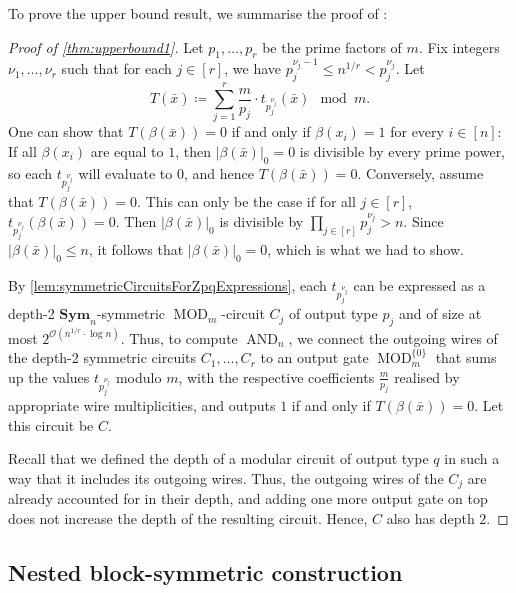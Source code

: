 \documentclass[11pt]{article}
\DeclareMathOperator{\MOD}{MOD}
\DeclareMathOperator{\AND}{AND}
\newcommand{\Sym}{\mathbf{Sym}}
\newcommand{\Oo}{{\mathcal O}}
\theoremstyle{definition}
\theoremstyle{plain}
\theoremstyle{remark}
\theoremstyle{remark}
\begin{document}
To prove the upper bound result, we summarise the proof of \cite[Proposition 3.1]{IdziakKK22LICS}:
\begin{proof}[Proof of \cref{thm:upperbound1}]
	Let $p_1, \dots, p_r$ be the prime factors of $m$. Fix integers $\nu_1, \dots, \nu_r$ such that for each $j \in [r]$, we have $p_j^{\nu_j-1} \leq n^{1/r} < p_j^{\nu_j}$. Let
	\[
	T(\bar{x}) \coloneqq \sum_{j =1}^r \frac{m}{p_j} \cdot t_{p_j^{\nu_j}}(\bar{x}) \mod m.
	\]
	One can show that $T(\beta(\bar{x})) = 0$ if and only if $\beta(x_i) = 1$ for every $i \in [n]$:
	If all $\beta(x_i)$ are equal to $1$, then $|\beta(\bar{x})|_0 = 0$ is divisible by every prime power, so each $t_{p_j^{\nu_j}}$ will evaluate to $0$, and hence $T(\beta(\bar{x})) = 0$. Conversely, assume that $T(\beta(\bar{x})) = 0$. This can only be the case if for all $j \in [r]$,  $t_{p_j^{\nu_j}}(\beta(\bar{x})) = 0$. Then $|\beta(\bar{x})|_0$ is divisible by $\prod_{j \in [r]} p_j^{\nu_j} > n$. Since $|\beta(\bar{x})|_0 \leq n$, it follows that $|\beta(\bar{x})|_0 = 0$, which is what we had to show.
	
	By \cref{lem:symmetricCircuitsForZpqExpressions}, each $t_{p_j^{\nu_j}}$ can be expressed as a depth-2 $\Sym_n$-symmetric $\MOD_m$-circuit $C_j$ of output type $p_j$ and of size at most $2^{\Oo(n^{1/r} \cdot \log n)}$.
	Thus, to compute $\AND_n$, we connect the outgoing wires of the depth-2 symmetric circuits $C_1, \dots, C_r$ to an output gate $\MOD_m^{\{0\}}$ that sums up the values $t_{p_j^{\nu_j}}$ modulo $m$, with the respective coefficients $\frac{m}{p_j}$ realised by appropriate wire multiplicities, and outputs $1$ if and only if $T(\beta(\bar{x})) = 0$. Let this circuit be $C$.
	
	Recall that we defined the depth of a modular circuit of output type $q$ in such a way that it includes its outgoing wires. 
	Thus, the outgoing wires of the $C_j$ are already accounted for in their depth, and adding one more output gate on top does not increase the depth of the resulting circuit. Hence, $C$ also has depth $2$.
\end{proof}	




\subsection{Nested block-symmetric construction}
\label{sec:upperbound2}
\end{document}
